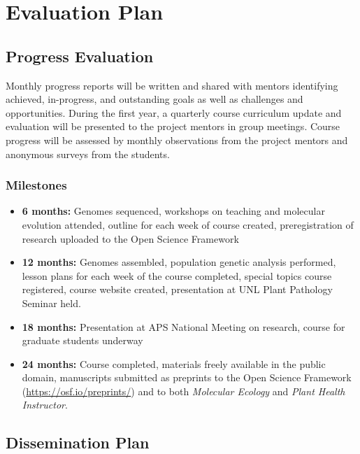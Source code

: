 \documentclass[12pt,letterpaper]{article}
\begin{document}

\section{Evaluation Plan}

\subsection{Progress Evaluation}

Monthly progress reports will be written and shared with mentors identifying achieved, in-progress, and outstanding goals as well as challenges and opportunities. During the first year, a quarterly course curriculum update and evaluation will be presented to the project mentors in group meetings. Course progress will be assessed by monthly observations from the project mentors and anonymous surveys from the students.

\subsubsection{Milestones}
\begin{itemize}
  \item \textbf{6 months:} Genomes sequenced, workshops on teaching and molecular evolution attended, outline for each week of course created, preregistration of research uploaded to the Open Science Framework
  \item \textbf{12 months:} Genomes assembled, population genetic analysis performed, lesson plans for each week of the course completed, special topics course registered, course website created, presentation at UNL Plant Pathology Seminar held.
  \item \textbf{18 months:} Presentation at APS National Meeting on research, course for graduate students underway
  \item \textbf{24 months:} Course completed, materials freely available in the public domain, manuscripts submitted as preprints to the Open Science Framework (\url{https://osf.io/preprints/}) and to both \textit{Molecular Ecology} and \textit{Plant Health Instructor}.
\end{itemize}

\subsection{Dissemination Plan}
\end{document}
